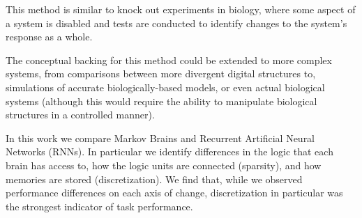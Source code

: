 This method is similar to knock out experiments in biology, where some aspect of a system is disabled and tests are conducted to identify changes to the system's response as a whole.

The conceptual backing for this method could be extended to more complex systems, from comparisons between more divergent digital structures to, simulations of accurate biologically-based models, or even actual biological systems (although this would require the ability to manipulate biological structures in a controlled manner).

In this work we compare Markov Brains and Recurrent Artificial Neural Networks (RNNs). 
In particular we identify differences in the logic that each brain has access to, how the logic units are connected (sparsity), and how memories are stored (discretization). 
We find that, while we observed performance differences on each axis of change, discretization in particular was the strongest indicator of task performance.
